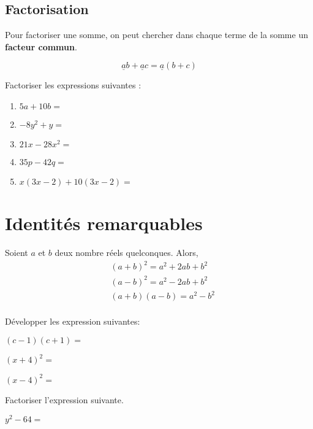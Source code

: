 \documentclass{poly}
\begin{document}
\subsection{Factorisation}
\begin{tcolorbox}
Pour factoriser une somme, on peut chercher dans chaque terme de la somme un \textbf{facteur commun}.
\end{tcolorbox}
\begin{equation*}
\underline{a}b + \underline{a}c = \underline{a}(b + c)
\end{equation*}
\begin{example}
Factoriser les expressions suivantes :
\begin{enumerate}[label=\emph{\alph*)}]
\item $5a + 10b =$ \answerline
\item $-8y^2 + y =$ \answerline
\item $21x - 28x^2 =$ \answerline
\item $35p - 42q =$ \answerline
\item $x(3x - 2) + 10(3x - 2) =$ \answerline
\end{enumerate}
\end{example}
\section{Identités remarquables}
\begin{proposition}
Soient $a$ et $b$ deux nombre réels quelconques. Alors,
\begin{equation*}
\begin{aligned}
&(a + b)^2 = a^2 + 2ab + b^2\\ 
&(a - b)^2 = a^2 - 2ab + b^2\\ 
&(a + b)(a - b) = a^2 - b^2\\ 
\end{aligned}
\end{equation*}
\end{proposition}
\begin{example}
Développer les expression suivantes:
\begin{alphaquestions}
\item $(c-1)(c+1)=$ \answerline
\item $(x+4)^2=$ \answerline
\item $(x-4)^2=$ \answerline
\end{alphaquestions}    
\end{example}
\vspace*{0.5cm}
\begin{example}
Factoriser l'expression suivante. 

$y^2 - 64 =$ \answerline
\end{example}
\newpage
\end{document}
